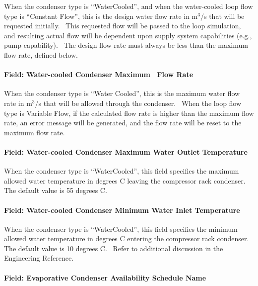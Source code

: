 When the condenser type is ``WaterCooled'', and when the water-cooled loop flow type is ``Constant Flow'', this is the design water flow rate in m\(^{3}\)/s that will be requested initially.~ This requested flow will be passed to the loop simulation, and resulting actual flow will be dependent upon supply system capabilities (e.g., pump capability).~ The design flow rate must always be less than the maximum flow rate, defined below.

\paragraph{Field: Water-cooled Condenser Maximum~ Flow Rate}\label{field-water-cooled-condenser-maximum-flow-rate}

When the condenser type is ``Water Cooled'', this is the maximum water flow rate in m\(^{3}\)/s that will be allowed through the condenser.~ When the loop flow type is Variable Flow, if the calculated flow rate is higher than the maximum flow rate, an error message will be generated, and the flow rate will be reset to the maximum flow rate.

\paragraph{Field: Water-cooled Condenser Maximum Water Outlet Temperature}\label{field-water-cooled-condenser-maximum-water-outlet-temperature}

When the condenser type is ``WaterCooled'', this field specifies the maximum allowed water temperature in degrees C leaving the compressor rack condenser. The default value is 55 degrees C.

\paragraph{Field: Water-cooled Condenser Minimum Water Inlet Temperature}\label{field-water-cooled-condenser-minimum-water-inlet-temperature}

When the condenser type is ``WaterCooled'', this field specifies the minimum allowed water temperature in degrees C entering the compressor rack condenser. The default value is 10 degrees C.~ Refer to additional discussion in the Engineering Reference.

\paragraph{Field: Evaporative Condenser Availability Schedule Name}\label{field-evaporative-condenser-availability-schedule-name}

